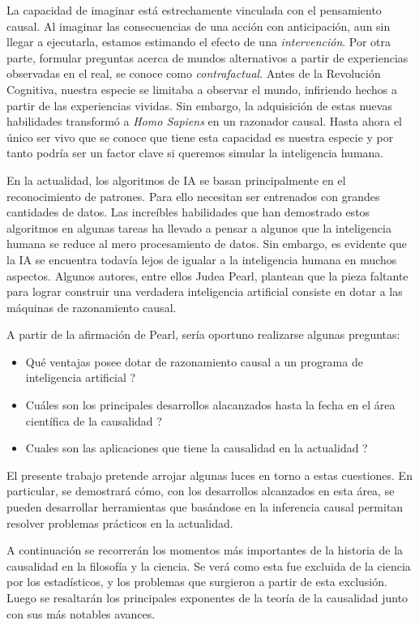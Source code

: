 \begin{introduction}
	La capacidad de imaginar está estrechamente vinculada con el pensamiento causal.
	Al imaginar las consecuencias de una acción con anticipación, aun sin llegar a ejecutarla, estamos estimando el efecto de una \textit{intervención}. Por otra parte, formular preguntas acerca de mundos alternativos a partir de experiencias observadas en el real, se conoce como \textit{contrafactual}. Antes de la Revolución Cognitiva, nuestra especie se limitaba a observar el mundo, infiriendo hechos a partir de las experiencias vividas. Sin embargo, la adquisición de estas nuevas habilidades transformó a \textit{Homo Sapiens} en un razonador causal. Hasta ahora el único ser vivo que se conoce que tiene esta capacidad es nuestra especie y por tanto podría ser un factor clave si queremos simular la inteligencia humana.
	
	En la actualidad, los algoritmos de IA se basan principalmente en el reconocimiento de patrones. Para ello necesitan ser entrenados con grandes cantidades de datos. Las increíbles habilidades que han demostrado estos algoritmos en algunas tareas ha llevado a pensar a algunos que la inteligencia humana se reduce al mero procesamiento de datos. Sin embargo, es evidente que la IA se encuentra todavía lejos de igualar a la inteligencia humana en muchos aspectos. Algunos autores, entre ellos Judea Pearl, plantean que la pieza faltante para lograr construir una verdadera inteligencia artificial consiste en dotar a las máquinas de razonamiento causal.\cite{PearlMackenzie18}
	
	A partir de la afirmación de Pearl, sería oportuno realizarse algunas preguntas:
	\begin{itemize}
		\item \textquestiondown Qué ventajas posee dotar de razonamiento causal a un programa de inteligencia artificial ?
		\item \textquestiondown  Cuáles son los principales desarrollos alacanzados hasta la fecha en el área científica de la causalidad ?
		\item \textquestiondown Cuales son las aplicaciones que tiene la causalidad en la actualidad ?
	\end{itemize}
	El presente trabajo pretende arrojar algunas luces en torno a estas cuestiones. En particular, se demostrará cómo, con los desarrollos alcanzados en esta área, se pueden desarrollar herramientas que basándose en la inferencia causal permitan resolver problemas prácticos en la actualidad.
	
	A continuación se recorrerán los momentos más importantes de la historia de la causalidad en la filosofía y la ciencia. Se verá como esta fue excluida de la ciencia por los estadísticos, y los problemas que surgieron a partir de esta exclusión. Luego se resaltarán los principales exponentes de la teoría de la causalidad junto con sus más notables avances.
	

\end{introduction}
